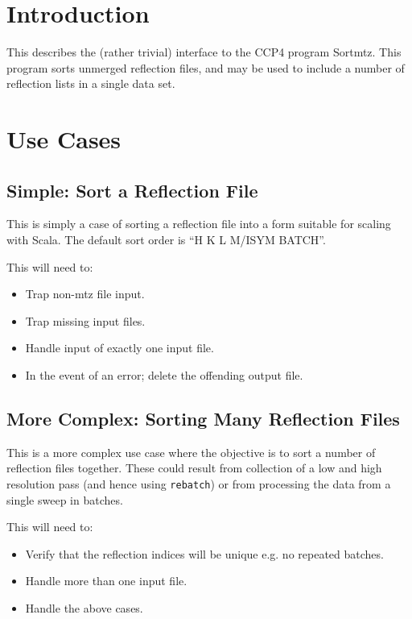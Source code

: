 \documentclass[a4paper, 11pt]{article}
\begin{document}
\section{Introduction}

This describes the (rather trivial) interface to the CCP4 program Sortmtz.
This program sorts unmerged reflection files, and may be used to include 
a number of reflection lists in a single data set.

\section{Use Cases}

\subsection{Simple: Sort a Reflection File}

This is simply a case of sorting a reflection file into a form suitable for
scaling with Scala. The default sort order is ``H K L M/ISYM BATCH''.

This will need to:

\begin{itemize}
\item{Trap non-mtz file input.}
\item{Trap missing input files.}
\item{Handle input of exactly one input file.}
\item{In the event of an error; delete the offending output file.}
\end{itemize}

\subsection{More Complex: Sorting Many Reflection Files}

This is a more complex use case where the objective is to sort a number
of reflection files together. These could result from collection of a low
and high resolution pass (and hence using \verb|rebatch|) or from processing
the data from a single sweep in batches. 

This will need to:

\begin{itemize}
\item{Verify that the reflection indices will be unique e.g. no repeated 
batches.}
\item{Handle more than one input file.}
\item{Handle the above cases.}
\end{itemize}
\end{document}
